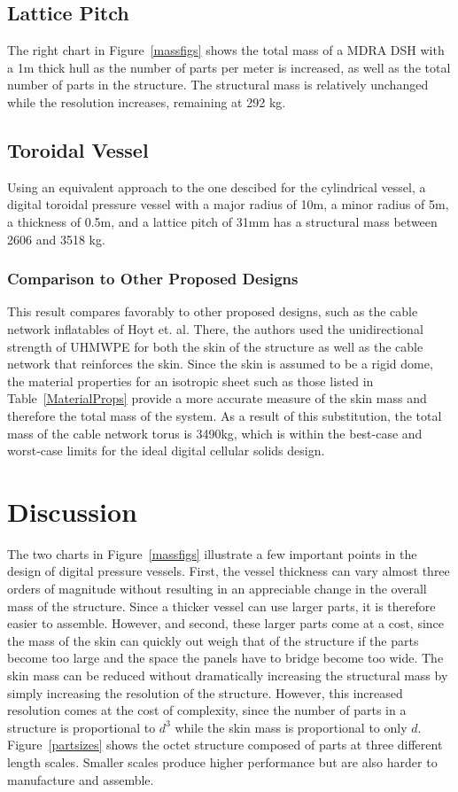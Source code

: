 \documentclass[twocolumn,letterpaper]{IEEEAerospaceCLS}  %
\begin{document}
\subsection{Lattice Pitch}
The right chart in Figure~\ref{massfigs} shows the total mass of a MDRA DSH with a 1m thick hull as the number of parts per meter is increased, as well as the total number of parts in the structure. The structural mass is relatively unchanged while the resolution increases, remaining at 292 kg.

\subsection{Toroidal Vessel}
Using an equivalent approach to the one descibed for the cylindrical vessel, a digital toroidal pressure vessel with a major radius of 10m, a minor radius of 5m, a thickness of 0.5m, and a lattice pitch of 31mm has a structural mass between 2606 and 3518 kg. 

\subsubsection{Comparison to Other Proposed Designs}
This result compares favorably to other proposed designs, such as the cable network inflatables of Hoyt et. al.\cite{skelton2014growth} There, the authors used the unidirectional strength of UHMWPE for both the skin of the structure as well as the cable network that reinforces the skin. Since the skin is assumed to be a rigid dome, the material properties for an isotropic sheet such as those listed in Table~\ref{MaterialProps} provide a more accurate measure of the skin mass and therefore the total mass of the system. As a result of this substitution, the total mass of the cable network torus is 3490kg, which is within the best-case and worst-case limits for the ideal digital cellular solids design.

\section{Discussion}
The two charts in Figure~\ref{massfigs} illustrate a few important points in the design of digital pressure vessels. First, the vessel thickness can vary almost three orders of magnitude without resulting in an appreciable change in the overall mass of the structure. Since a thicker vessel can use larger parts, it is therefore easier to assemble. However, and second, these larger parts come at a cost, since the mass of the skin can quickly out weigh that of the structure if the parts become too large and the space the panels have to bridge become too wide. The skin mass can be reduced without dramatically increasing the structural mass by simply increasing the resolution of the structure. However, this increased resolution comes at the cost of complexity, since the number of parts in a structure is proportional to $d^3$ while the skin mass is proportional to only $d$. Figure~\ref{partsizes} shows the octet structure composed of parts at three different length scales. Smaller scales produce higher performance but are also harder to manufacture and assemble. 
\end{document}
